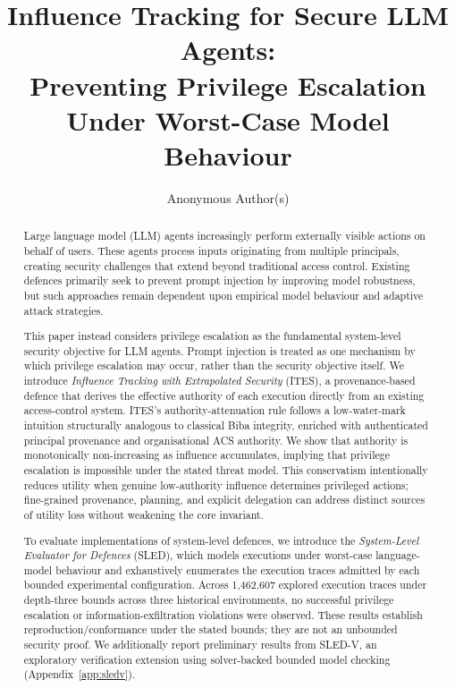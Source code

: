 \documentclass{article}
\title{Influence Tracking for Secure LLM Agents:\\
Preventing Privilege Escalation Under Worst-Case Model Behaviour}
\author{
  Anonymous Author(s)
}
\begin{document}
\maketitle

\begin{abstract}
Large language model (LLM) agents increasingly perform externally visible
actions on behalf of users. These agents process inputs originating from
multiple principals, creating security challenges that extend beyond
traditional access control. Existing defences primarily seek to prevent prompt
injection by improving model robustness, but such approaches remain dependent
upon empirical model behaviour and adaptive attack strategies.

This paper instead considers privilege escalation as the fundamental
system-level security objective for LLM agents. Prompt injection is treated as
one mechanism by which privilege escalation may occur, rather than the security
objective itself. We introduce \emph{Influence Tracking with Extrapolated
Security} (ITES), a provenance-based defence that derives the effective
authority of each execution directly from an existing access-control system.
ITES's authority-attenuation rule follows a low-water-mark intuition
structurally analogous to classical Biba integrity, enriched with authenticated
principal provenance and organisational ACS authority. We show that authority is
monotonically non-increasing as influence accumulates, implying that
privilege escalation is impossible under the stated threat model.
This conservatism intentionally reduces utility when genuine low-authority
influence determines privileged actions; fine-grained provenance, planning,
and explicit delegation can address distinct sources of utility loss without
weakening the core invariant.

To evaluate implementations of system-level defences, we introduce the
\emph{System-Level Evaluator for Defences} (SLED), which models executions
under worst-case language-model behaviour and exhaustively enumerates the
execution traces admitted by each bounded experimental configuration.
Across 1{,}462{,}607 explored execution traces under depth-three bounds
across three historical environments, no successful
privilege escalation or information-exfiltration violations were observed.
These results establish reproduction/conformance under the stated bounds;
they are not an unbounded security proof. We additionally report preliminary results from SLED-V,
an exploratory verification extension using solver-backed bounded model
checking (Appendix~\ref{app:sledv}).
\end{abstract}
\end{document}
